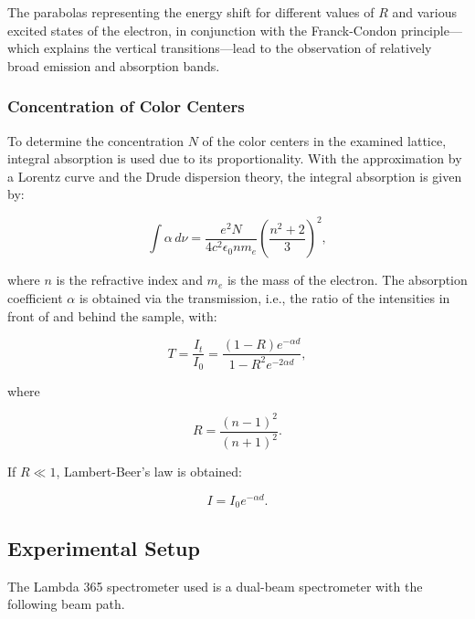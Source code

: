 \documentclass{article}
\begin{document}
The parabolas representing the energy shift for different values of $R$ and various excited states of the electron, in conjunction with the Franck-Condon principle—which explains the vertical transitions—lead to the observation of relatively broad emission and absorption bands.

\subsubsection{Concentration of Color Centers}

To determine the concentration $N$ of the color centers in the examined lattice, integral absorption is used due to its proportionality. With the approximation by a Lorentz curve and the Drude dispersion theory, the integral absorption is given by:

\begin{equation}
\label{eq:concentration}
\int \alpha \, d\nu = \frac{e^2 N}{4c^2 \epsilon_0 n m_e} \left( \frac{n^2 + 2}{3} \right)^2,
\end{equation}

where $n$ is the refractive index and $m_e$ is the mass of the electron. The absorption coefficient $\alpha$ is obtained via the transmission, i.e., the ratio of the intensities in front of and behind the sample, with:

\begin{equation*}
T = \frac{I_t}{I_0} = \frac{(1 - R) e^{- \alpha d}}{1 - R^2 e^{-2 \alpha d}},
\end{equation*}

where 

\begin{equation*}
R = \frac{(n - 1)^2}{(n + 1)^2}.
\end{equation*}

If $R \ll 1$, Lambert-Beer's law is obtained:

\begin{equation*}
I = I_0 e^{- \alpha d}.
\end{equation*}

\pagebreak{}

\subsection{Experimental Setup}

The Lambda 365 spectrometer used is a dual-beam spectrometer with the following beam path.
\end{document}
